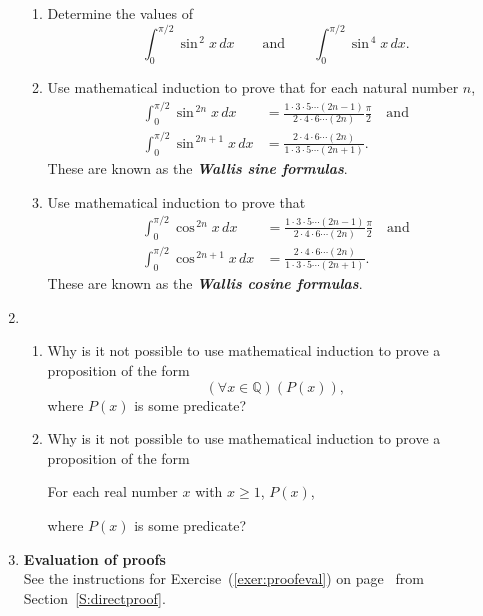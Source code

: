\begin{enumerate}
\begin{enumerate}
\item  Determine the values of 
\[
\int_{0}^{\pi/2} \sin^{\,2} x \, dx \qquad \text{and} \qquad 
\int_{0}^{\pi/2} \sin^{\,4} x \, dx.
\]
\item Use mathematical induction to prove that for each natural number $n$, 
\begin{align*}
\int_{0}^{\pi/2} \sin^{\,2n}x \, dx &= \frac{1 \cdot 3 \cdot 5 \cdots (2n - 1)}{2 \cdot 4 \cdot 6 \cdots (2n)} \frac{\pi}{2} \quad \text{and} \\
\int_{0}^{\pi/2} \sin^{\,2n+1}x \, dx &= \frac{2 \cdot 4 \cdot 6 \cdots (2n)}{1 \cdot 3  \cdot 5 \cdots (2n + 1)}. 
\end{align*}
These are known as the \textbf{\emph{Wallis sine formulas}}.
%
\item Use mathematical induction to prove that
\begin{align*}
\int_{0}^{\pi/2} \cos^{\,2n}x \, dx &= \frac{1 \cdot 3 \cdot 5 \cdots (2n - 1)}{2 \cdot 4 \cdot 6 \cdots (2n)} \frac{\pi}{2} \quad \text{and} \\
\int_{0}^{\pi/2} \cos^{\,2n+1}x \, dx &= \frac{2 \cdot 4 \cdot 6 \cdots (2n)}{1 \cdot 3 \cdot 5 \cdots (2n+1)}.
\end{align*}
These are known as the \textbf{\emph{Wallis cosine formulas}}.
%
\end{enumerate}


\item \begin{enumerate}
\item Why is it not possible to use mathematical induction to prove a proposition of the form
\[
\left( {\forall x \in \mathbb{Q}} \right)\left( {P( x )} \right),
\]
where  $P( x )$ is some predicate?

\item Why is it not possible to use mathematical induction to prove a proposition of the form
\begin{center}
For each real number  $x$  with  $x \geq 1$,  $P( x )$,
\end{center}
where  $P( x )$ is some predicate?
\end{enumerate}

\item \textbf{Evaluation of proofs}  \hfill \\
See the instructions for Exercise~(\ref{exer:proofeval}) on 
page~\pageref{exer:proofeval} from Section~\ref{S:directproof}.


\end{enumerate}
